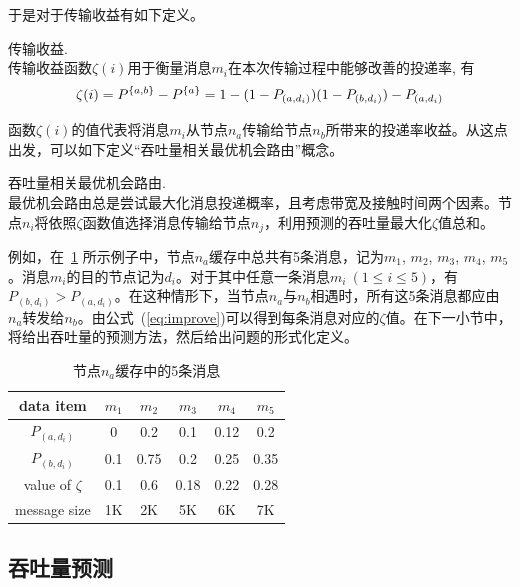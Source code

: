 于是对于传输收益有如下定义。

\begin{definition}传输收益.\\
传输收益函数$\zeta(i)$用于衡量消息$m_i$在本次传输过程中能够改善的投递率, 有
\begin{equation}
\zeta(i)=P^{\{a,b\}}-P^{\{a\}}\\
=1-(1-P_{(a,d_i)})(1-P_{(b,d_i)})-P_{(a,d_i)}
\label{eq:improve}
\end{equation}
\end{definition}

函数$\zeta(i)$的值代表将消息$m_i$从节点$n_a$传输给节点$n_b$所带来的投递率收益。从这点出发，可以如下定义“吞吐量相关最优机会路由”概念。

\begin{definition} 吞吐量相关最优机会路由. \\
最优机会路由总是尝试最大化消息投递概率，且考虑带宽及接触时间两个因素。节点$n_i$将依照$\zeta$函数值选择消息传输给节点$n_j$，利用预测的吞吐量最大化$\zeta$值总和。
\label{def:throughput-routing}
\end{definition}

例如，在\tablename~\ref{tab:chap4_zeta} 所示例子中，节点$n_a$缓存中总共有5条消息，记为$m_1$, $m_2$, $m_3$, $m_4$, $m_5$。消息$m_i$的目的节点记为$d_i$。对于其中任意一条消息$m_i~(1\leq i\leq 5)$，有$P_{(b,d_i)}>P_{(a,d_i)}$。在这种情形下，当节点$n_a$与$n_b$相遇时，所有这5条消息都应由$n_a$转发给$n_b$。由公式~(\ref{eq:improve})可以得到每条消息对应的$\zeta$值。在下一小节中，将给出吞吐量的预测方法，然后给出问题的形式化定义。

\begin{table}
\centering
  \caption{节点$n_a$缓存中的5条消息}
  \label{tab:chap4_zeta}
  \begin{tabular}{cccccc}
  \hline
    data item  & $m_1$ & $m_2$ & $m_3$ & $m_4$ & $m_5$ \\
    \hline
    $P_{(a,d_i)}$ & 0 & 0.2 & 0.1 & 0.12 & 0.2 \\
    $P_{(b,d_i)}$ & 0.1  & 0.75  & 0.2 & 0.25 & 0.35  \\
    value of $\zeta$ & 0.1 & 0.6 & 0.18 & 0.22 & 0.28 \\
    message size & 1K  & 2K  & 5K   & 6K   & 7K   \\
    \hline
  \end{tabular}
\end{table}

\subsection{吞吐量预测}
\label{sec:吞吐量预测}

